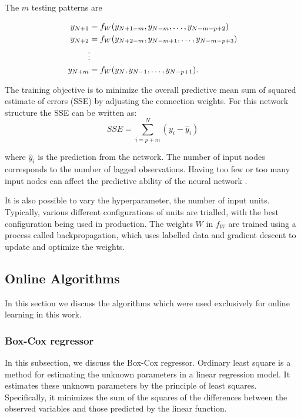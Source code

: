 \documentclass[final,3p,times,twocolumn,numbers]{elsarticle}
\begin{document}
The $m$ testing patterns are 

\begin{align}
y_{N+1} & =f_{W}(y_{N+1-m}, y_{N-m},\ldots,y_{N-m-p+2})\\
y_{N+2} & =f_{W}(y_{N+2-m}, y_{N-m+1},\ldots,y_{N-m-p+3})\\
&\vdotswithin  \notag \\
y_{N+m} & =f_{W}(y_{N},y_{N-1},\ldots,y_{N-p+1}).
\end{align}

The training objective is to minimize the overall predictive mean sum of squared estimate of errors (SSE) by adjusting the connection weights. For this network structure the SSE can be written as:
\begin{equation}
SSE = \sum_{i=p+m}^N(y_i-\hat{y}_i)
\end{equation}

\noindent where $\hat{y}_i$ is the prediction from the network. The number of input nodes corresponds to the number of lagged observations. Having too few or too many input nodes can affect the predictive ability of the neural network \cite{Pao2007}.

It is also possible to vary the hyperparameter, the number of input units. Typically, various different configurations of units are trialled, with the best configuration being used in production. The weights $W$ in $f_W$ are trained using a process called backpropagation, which uses labelled data and gradient descent to update and optimize the weights.

\subsection{Online Algorithms}

In this section we discuss the algorithms which were used exclusively for online learning in this work.

\subsubsection{Box-Cox regressor}

In this subsection, we discuss the Box-Cox regressor. Ordinary least square is a method for estimating the unknown parameters in a linear regression model. It estimates these unknown parameters by the principle of least squares. Specifically, it minimizes the sum of the squares of the differences between the observed variables and those predicted by the linear function.
\end{document}
